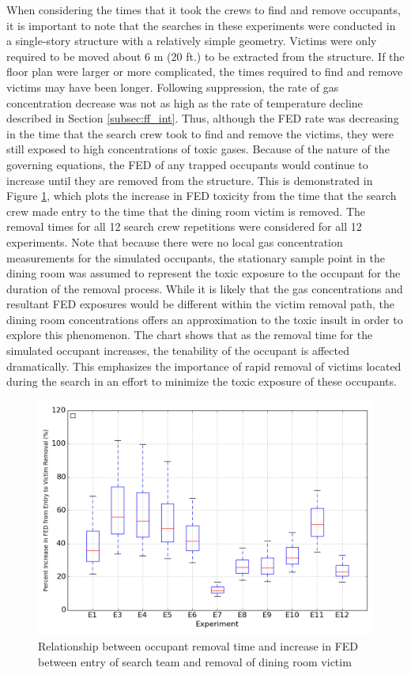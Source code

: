 \documentclass[12pt,oneside]{article}
\begin{document}
When considering the times that it took the crews to find and remove occupants, it is important to note that the searches in these experiments were conducted in a single-story structure with a relatively simple geometry. Victims were only required to be moved about 6 m (20 ft.) to be extracted from the structure. If the floor plan were larger or more complicated, the times required to find and remove victims may have been longer. Following suppression, the rate of gas concentration decrease was not as high as the rate of temperature decline described in Section \ref{subsec:ff_int}. Thus, although the FED rate was decreasing in the time that the search crew took to find and remove the victims, they were still exposed to high concentrations of toxic gases. Because of the nature of the governing equations, the FED of any trapped occupants would continue to increase until they are removed from the structure. This is demonstrated in Figure \ref{fig:vic_removal}, which plots the increase in FED toxicity from the time that the search crew made entry to the time that the dining room victim is removed. The removal times for all 12 search crew repetitions were considered for all 12 experiments. Note that because there were no local gas concentration measurements for the simulated occupants, the stationary sample point in the dining room was assumed to represent the toxic exposure to the occupant for the duration of the removal process. While it is likely that the gas concentrations and resultant FED exposures would be different within the victim removal path, the dining room concentrations offers an approximation to the toxic insult in order to explore this phenomenon. The chart shows that as the removal time for the simulated occupant increases, the tenability of the occupant is affected dramatically. This emphasizes the importance of rapid removal of victims located during the search in an effort to minimize the toxic exposure of these occupants. 

\begin{figure}[!ht]
	\centering
	\includegraphics[width=.75\textwidth]{../Figures/victim_removal/V1}
	\caption[Relationship between occupant removal time and increase in FED between entry of search team and removal of dining room victim]{Relationship between occupant removal time and increase in FED between entry of search team and removal of dining room victim}
	\label{fig:vic_removal}
\end{figure}
\end{document}
